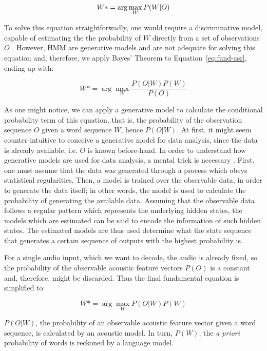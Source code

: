 \begin{equation}{\label{eq:fund-asr}}
W*= \arg\max_{W}P(W|O)
\end{equation}

To solve this equation straightforwadly, one would require a discriminative model,
capable of estimating the the probability of $W$ directly from a set of observations $O$ \cite{Gales2008}.
However, \ac{HMM} are generative models and are not adequate for solving this equation and,
therefore, we apply Bayes' Theorem to Equation~\ref{eq:fund-asr}, ending up with:

\begin{equation}
W*= \arg\max_{W}\frac{P(O|W)P(W)}{P(O)}
\end{equation}

As one might notice, we can apply a generative model to calculate the conditional probability term of this
equation, that is, the probability of the observation sequence $O$ given a word sequence $W$, hence $P(O|W)$.
At first, it might seem counter-intuitive to conceive a generative model for data analysis, since the 
data is already available, i.e. $O$ is known before-hand. In order to understand how generative models are used for data analysis, a mental trick is necessary \cite{Fink2014}. First, one must assume that the data was generated through a process which obeys statistical regularities. Then, a model is trained over the observable data, in order to generate the data itself; in other words, the model is used to calculate the probability of generating the available data. Assuming that the observable data follows a regular pattern which represents the underlying hidden states, the models which are estimated can be said to encode the information of such hidden states. The estimated models are thus used determine what the state sequence that generates a certain sequence of outputs with the highest probability is.

For a single audio input, which we want to decode, the audio is already fixed, so the 
probability of the observable acoustic feature vectors $P(O)$ is a constant and, therefore, 
might be discarded. Thus the final fundamental equation is simplified to:

\begin{equation}
W*= \arg\max_{W}P(O|W)P(W)
\end{equation}

$P(O|W)$, the probability of an observable acoustic feature vector given a word sequence, is calculated by 
an acoustic model. In turn, $P(W)$, the \emph{a priori} probability of words is reckoned by a language model.

